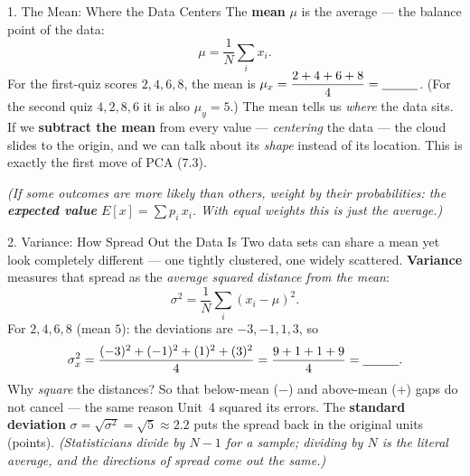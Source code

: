 \documentclass[10pt]{article}
\begin{document}
\begin{notesbox}{1. The Mean: Where the Data Centers}
The \textbf{mean} $\mu$ is the average --- the balance point of the data:
\[
  \mu=\frac1N\sum_{i} x_i.
\]
For the first-quiz scores $2,4,6,8$, the mean is $\mu_x=\dfrac{2+4+6+8}{4}=\blank{1.0cm}$. (For the second quiz
$4,2,8,6$ it is also $\mu_y=5$.) The mean tells us \emph{where} the data sits. If we \textbf{subtract the mean}
from every value --- \emph{centering} the data --- the cloud slides to the origin, and we can talk about its
\emph{shape} instead of its location. This is exactly the first move of PCA (7.3).

\smallskip
\textit{(If some outcomes are more likely than others, weight by their probabilities: the \textbf{expected value}
$E[x]=\sum p_i\,x_i$. With equal weights this is just the average.)}
\end{notesbox}

\begin{notesbox}{2. Variance: How Spread Out the Data Is}
Two data sets can share a mean yet look completely different --- one tightly clustered, one widely scattered.
\textbf{Variance} measures that spread as the \emph{average squared distance from the mean}:
\[
  \sigma^2=\frac1N\sum_i (x_i-\mu)^2.
\]
For $2,4,6,8$ (mean $5$): the deviations are $-3,-1,1,3$, so
\[
  \sigma_x^2=\frac{(-3)^2+(-1)^2+(1)^2+(3)^2}{4}=\frac{9+1+1+9}{4}=\blank{1.0cm}.
\]
Why \emph{square} the distances? So that below-mean ($-$) and above-mean ($+$) gaps do not cancel --- the same
reason Unit~4 squared its errors. The \textbf{standard deviation} $\sigma=\sqrt{\sigma^2}=\sqrt5\approx2.2$ puts
the spread back in the original units (points). \emph{(Statisticians divide by $N-1$ for a sample; dividing by
$N$ is the literal average, and the directions of spread come out the same.)}
\end{notesbox}
\end{document}
